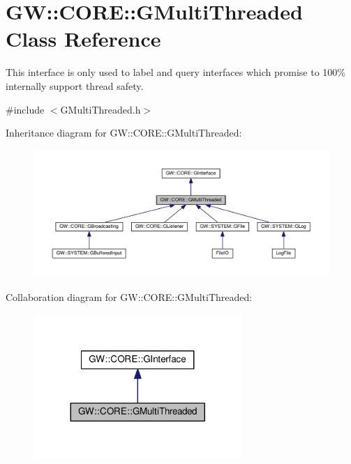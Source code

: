 \hypertarget{classGW_1_1CORE_1_1GMultiThreaded}{}\section{GW\+:\+:C\+O\+RE\+:\+:G\+Multi\+Threaded Class Reference}
\label{classGW_1_1CORE_1_1GMultiThreaded}


This interface is only used to label and query interfaces which promise to 100\% internally support thread safety.  




{\ttfamily \#include $<$G\+Multi\+Threaded.\+h$>$}



Inheritance diagram for GW\+:\+:C\+O\+RE\+:\+:G\+Multi\+Threaded\+:\nopagebreak
\begin{figure}[H]
\begin{center}
\leavevmode
\includegraphics[width=350pt]{classGW_1_1CORE_1_1GMultiThreaded__inherit__graph}
\end{center}
\end{figure}


Collaboration diagram for GW\+:\+:C\+O\+RE\+:\+:G\+Multi\+Threaded\+:\nopagebreak
\begin{figure}[H]
\begin{center}
\leavevmode
\includegraphics[width=224pt]{classGW_1_1CORE_1_1GMultiThreaded__coll__graph}
\end{center}
\end{figure}
